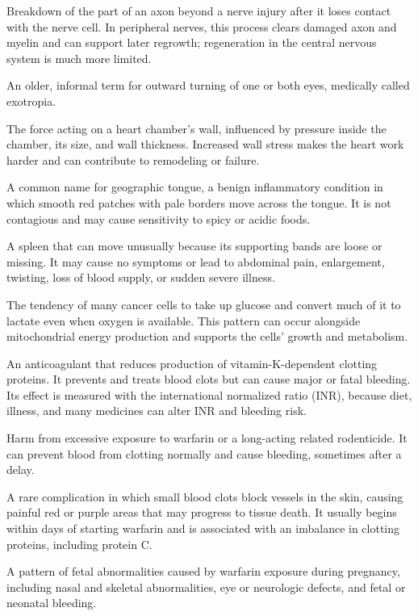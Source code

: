  Breakdown of the part of an axon beyond a nerve injury after it loses contact with the nerve cell. In peripheral nerves, this process clears damaged axon and myelin and can support later regrowth; regeneration in the central nervous system is much more limited.

 An older, informal term for outward turning of one or both eyes, medically called exotropia.

 The force acting on a heart chamber’s wall, influenced by pressure inside the chamber, its size, and wall thickness. Increased wall stress makes the heart work harder and can contribute to remodeling or failure.

 A common name for geographic tongue, a benign inflammatory condition in which smooth red patches with pale borders move across the tongue. It is not contagious and may cause sensitivity to spicy or acidic foods.

 A spleen that can move unusually because its supporting bands are loose or missing. It may cause no symptoms or lead to abdominal pain, enlargement, twisting, loss of blood supply, or sudden severe illness.

 The tendency of many cancer cells to take up glucose and convert much of it to lactate even when oxygen is available. This pattern can occur alongside mitochondrial energy production and supports the cells' growth and metabolism.

 An anticoagulant that reduces production of vitamin-K-dependent clotting proteins. It
prevents and treats blood clots but can cause major or fatal bleeding. Its effect is measured with the
international normalized ratio (INR), because diet, illness, and many medicines can alter INR and
bleeding risk.

 Harm from excessive exposure to warfarin or a long-acting related rodenticide. It can prevent blood from clotting normally and cause bleeding, sometimes after a delay.

 A rare complication in which small blood clots block vessels in the skin, causing painful red or purple areas that may progress to tissue death. It usually begins within days of starting warfarin and is associated with an imbalance in clotting proteins, including protein C.

 A pattern of fetal abnormalities caused by warfarin exposure during pregnancy, including nasal and skeletal abnormalities, eye or neurologic defects, and fetal or neonatal bleeding.

